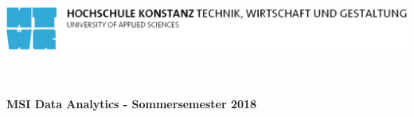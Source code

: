 
\begin{titlepage}
\vspace*{-2.7cm}

\begin{flushleft}
\hspace*{-1cm} \includegraphics[width=15.7cm]{htwg-logo.pdf}
\end{flushleft}

\vspace{3.5cm}

\begin{center}
	\huge{
		\textbf{\thema} \\[5cm]
	}
	\large{
		\textbf{\autor} \\[2cm]	
	}
	\normalsize{
		\textbf{MSI Data Analytics - Sommersemester 2018}
	}

	
\end{center}

\end{titlepage}

